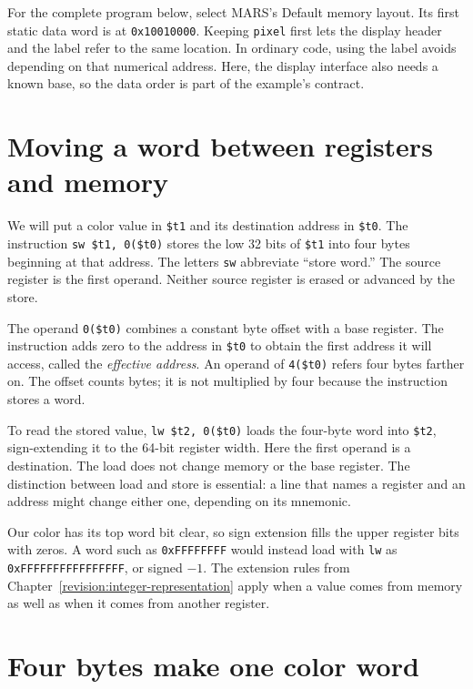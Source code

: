 For the complete program below, select MARS's Default memory layout. Its first
static data word is at \texttt{0x10010000}. Keeping \texttt{pixel} first lets the
display header and the label refer to the same location. In ordinary code, using
the label avoids depending on that numerical address. Here, the display interface
also needs a known base, so the data order is part of the example's contract.

\section{Moving a word between registers and memory}

We will put a color value in \texttt{\$t1} and its destination address in
\texttt{\$t0}. The instruction \texttt{sw \$t1, 0(\$t0)} stores the low 32 bits
of \texttt{\$t1} into four bytes beginning at that address. The letters
\texttt{sw} abbreviate ``store word.'' The source register is the first operand.
Neither source register is erased or advanced by the store.

The operand \texttt{0(\$t0)} combines a constant byte offset with a base register.
The instruction adds zero to the address in \texttt{\$t0} to obtain the first
address it will access, called the \emph{effective address}. An operand of
\texttt{4(\$t0)} refers four bytes farther on. The offset counts bytes; it is not
multiplied by four because the instruction stores a word.

To read the stored value, \texttt{lw \$t2, 0(\$t0)} loads the four-byte word
into \texttt{\$t2}, sign-extending it to the 64-bit register width. Here the first
operand is a destination. The load does not change memory or the base register.
The distinction between load and store is essential: a line that names a register
and an address might change either one, depending on its mnemonic.

Our color has its top word bit clear, so sign extension fills the upper register
bits with zeros. A word such as \texttt{0xFFFFFFFF} would instead load with
\texttt{lw} as \texttt{0xFFFFFFFFFFFFFFFF}, or signed $-1$. The extension rules
from Chapter~\ref{revision:integer-representation} apply when a value comes from
memory as well as when it comes from another register.

\section{Four bytes make one color word}

